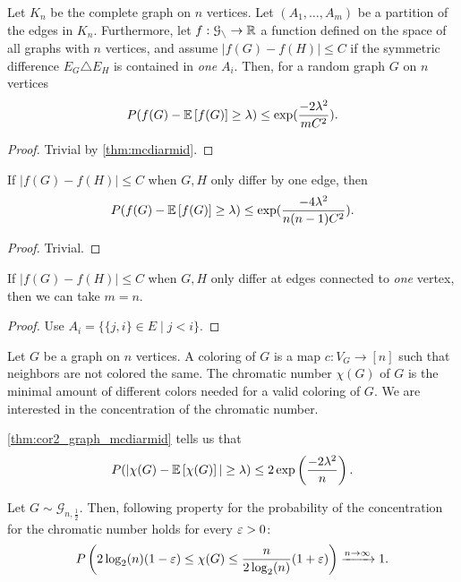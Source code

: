 \begin{lemma}
    Let $K_n$ be the complete graph on $n$ vertices.
    Let $(A_1, \dots, A_m)$ be a partition of the edges in $K_n$.
    Furthermore, let $f: \mathcal{G_n} \rightarrow \realnum$ a function defined on the space of all graphs with $n$ vertices,
    and assume $|f(G) - f(H)| \leq C$ if the symmetric difference $E_G \triangle E_H$
    is contained in \emph{one} $A_i$.
    Then, for a random graph $G$ on $n$ vertices
    \begin{align*}
        P(f(G) - \mathbb{E}\left[f(G)\right] \geq \lambda) \leq \exp(\frac{-2 \lambda^2}{mC^2}).
    \end{align*}
\end{lemma}
\begin{proof}
    Trivial by \autoref{thm:mcdiarmid}.
\end{proof}
\begin{corollary}
    If $|f(G) - f(H)| \leq C$ when $G,H$ only differ by one edge, then
    \begin{align*}
        P(f(G) - \mathbb{E}\left[f(G)\right] \geq \lambda) \leq \exp(\frac{-4 \lambda^2}{n(n-1)C^2}).
    \end{align*}
\end{corollary}
\begin{proof}
    Trivial.
\end{proof}
\begin{corollary} \label{thm:cor2_graph_mcdiarmid}
    If $|f(G) - f(H)| \leq C$ when $G,H$ only differ at edges connected to \emph{one} vertex,
    then we can take $m=n$.
\end{corollary}
\begin{proof}
    Use $A_i = \{ \{j,i\}\in E \mid j < i \}$.
\end{proof}
\begin{problem}
Let $G$ be a graph on $n$ vertices.
A coloring of $G$ is a map $c: V_G \rightarrow [n]$
such that neighbors are not colored the same.
The chromatic number $\chi(G)$ of $G$ is the minimal amount of different colors needed
for a valid coloring of $G$.
We are interested in the concentration of the chromatic number.
\end{problem}
\autoref{thm:cor2_graph_mcdiarmid} tells us that
\begin{align*}
    P(|\chi(G) - \mathbb{E}\left[\chi(G)\right]| \geq \lambda) \leq 2\exp\left(\frac{-2\lambda^2}{n}\right).
\end{align*}
\begin{theorem}
    Let $G \sim \mathcal{G}_{n,\frac{1}{2}}$.
    Then, following property for the probability of the concentration for the chromatic number
    holds for every $\varepsilon > 0$:
    \begin{align*}
        P\left(2 \log_2(n)(1 - \varepsilon) \leq \chi(G) \leq \frac{n}{2 \log_2(n)}(1+\varepsilon)\right) \xrightarrow{n \rightarrow \infty} 1.
    \end{align*}
\end{theorem}
